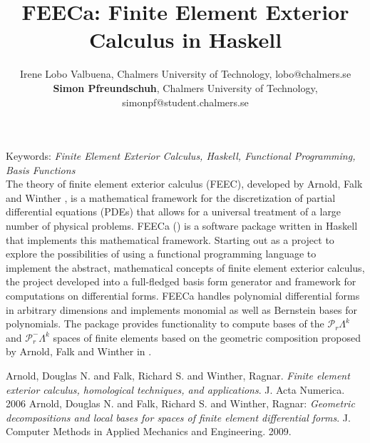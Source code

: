 \documentclass[11pt,a4paper]{article}
\begin{document}
\thispagestyle{empty}

\title{FEECa: Finite Element Exterior Calculus in Haskell}

\author{Irene Lobo Valbuena, Chalmers University of Technology, lobo@chalmers.se \\
        \textbf{Simon Pfreundschuh}, Chalmers University of Technology, simonpf@student.chalmers.se}

\date{} %
\maketitle\thispagestyle{empty}

Keywords: \emph{Finite Element Exterior Calculus, Haskell, Functional Programming,
  Basis Functions}\\


The theory of finite element exterior calculus (FEEC), developed by
Arnold, Falk and Winther \cite{arnold1}, is a mathematical framework
for the discretization of partial differential equations (PDEs) that
allows for a universal treatment of a large number of physical
problems.  FEECa (\textipa{["fi:ka]}) is a software package written in
Haskell that implements this mathematical framework. Starting out as a
project to explore the possibilities of using a functional programming
language to implement the abstract, mathematical concepts of finite
element exterior calculus, the project developed into a full-fledged
basis form generator and framework for computations on differential
forms. FEECa handles polynomial differential forms in arbitrary
dimensions and implements monomial as well as Bernstein bases for
polynomials. The package provides functionality to compute bases of
the $\mathcal{P}_r\Lambda^k$ and $\mathcal{P}^-_r\Lambda^k$ spaces of
finite elements based on the geometric composition proposed by Arnold,
 Falk and Winther in \cite{arnold2}.

\begin{thebibliography}{00}
 Arnold, Douglas N. and Falk, Richard S. and Winther, Ragnar.
  \textit{Finite element exterior calculus, homological techniques, and applications}.
  J. Acta Numerica. 2006
 Arnold, Douglas N. and Falk, Richard S. and Winther, Ragnar:
  \textit{Geometric decompositions and local bases for spaces of finite element differential forms}.
  J. Computer Methods in Applied Mechanics and Engineering. 2009.
\end{thebibliography}
\end{document}

